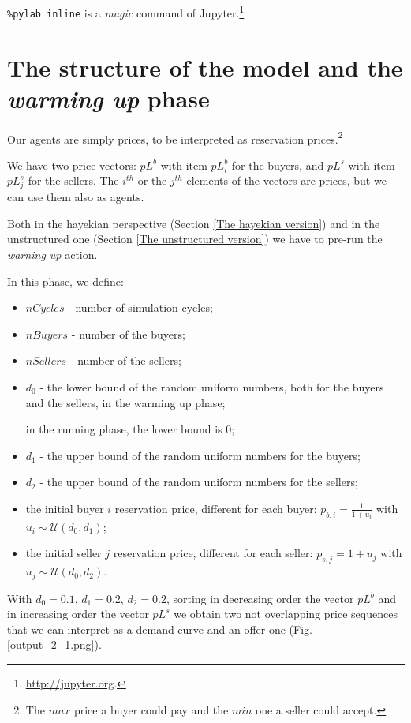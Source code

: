 \documentclass[12pt]{report}
\begin{document}
\verb|%pylab inline| 
is a \emph{magic} command of Jupyter.\footnote{\url{http://jupyter.org}.}

\section{The structure of the model and the \emph{warming up} phase}\label{The structure of the model}

Our agents are simply prices, to be interpreted as reservation prices.\footnote{The $max$ price a buyer could pay and the $min$ one a seller could accept.}

We have two price vectors: $pL^b$ with item $pL^b_i$ for the buyers, and $pL^s$ with item $pL^s_j$ for the sellers. The $i^{th}$ or the $j^{th}$ elements of the vectors are prices, but  we can use them also as agents.

Both in the hayekian perspective (Section \ref{The hayekian version}) and in the unstructured one (Section \ref{The unstructured version}) we have to pre-run the \emph{warning up} action.

In this phase, we define:

\begin{itemize}
\item $nCycles$ - number of simulation cycles;
\item $nBuyers$  - number of the buyers;
\item $nSellers$ - number of the sellers;
\item $d_0$ - the lower bound of the random uniform numbers, both for the buyers and the sellers, in the warming up phase; 

in the running phase, the lower bound is $0$;
\item $d_1$ - the upper bound of the random uniform numbers for the buyers;
\item $d_2$ - the upper bound of the random uniform numbers for the sellers;
\item the initial buyer $i$ reservation price, different for each buyer: $p_{b,i}=\frac{1} {1 + u_i}$ with $u_i\sim\mathcal{U}(d_0,d_1)$;
\item the initial seller $j$ reservation price, different for each seller: $p_{s,j}=1 + u_j$ with $u_j\sim\mathcal{U}(d_0,d_2)$.
\end{itemize}

With  $d_0=0.1$, $d_1=0.2$, $d_2=0.2$, sorting in decreasing order the vector  $pL^b$ and in increasing order the vector  $pL^s$ we obtain two not overlapping price sequences that we can interpret as a demand curve and an offer one (Fig. \ref{output_2_1.png}).
\end{document}

